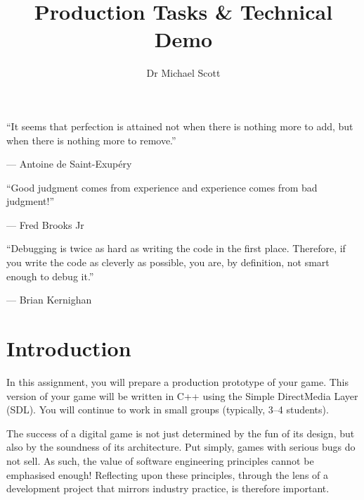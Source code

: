 \documentclass{../fal_assignment}
\title{Production Tasks \& Technical Demo}
\author{Dr Michael Scott}
\begin{document}
\maketitle

\begin{marginquote}
    ``It seems that perfection is attained not when there is nothing more to add,
        but when there is nothing more to remove.''
    
    --- Antoine de Saint-Exup\'ery
    
    \marginquoterule
    
    ``Good judgment comes from experience and experience comes from bad judgment!''
    
    --- Fred Brooks Jr
    
    \marginquoterule
    
    ``Debugging is twice as hard as writing the code in the first place.
     Therefore, if you write the code as cleverly as possible, you are, by definition, not smart enough to debug it.'' 
 
         --- Brian Kernighan
     
\end{marginquote}

\section*{Introduction}

In this assignment, you will prepare a production prototype of your game. This version of your game will be written in C++ using the Simple DirectMedia Layer (SDL). You will continue to work in small groups (typically, 3--4 students).

The success of a digital game is not just determined by the fun of its design, but also by the soundness of its architecture. Put simply, games with serious bugs do not sell. As such, the value of software engineering principles cannot be emphasised enough! Reflecting upon these principles, through the lens of a development project that mirrors industry practice, is therefore important.
\end{document}
